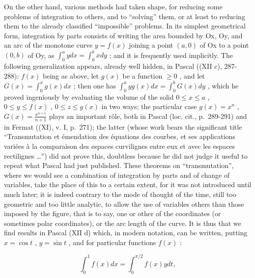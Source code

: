 On the other hand, various methods had taken shape, for reducing some problems of integration to others, and to ``solving'' them, or at least to reducing them to the already classified ``impossible'' problems. In its simplest geometrical form, integration by parts consists of writing the area bounded by Ox, Oy, and an arc of the monotone curve \(y = f(x)\) joining a point \((a, 0)\) of Ox to a point \((0, b)\) of Oy, as \(\int_{0}^{a} y dx = \int_{0}^{b} x dy\) ; and it is frequently used implicitly. The following generalization appears, already well hidden, in Pascal ((XII c), 287-288): \(f(x)\) being as above, let \(g(x)\) be a function \(\geqslant 0\) , and let \(G(x) = \int_{0}^{x} g(x) dx\) ; then one has \(\int_{0}^{a} y g(x) dx = \int_{0}^{b} G(x) dy\) , which he proved ingeniously by evaluating the volume of the solid \(0 \leqslant x \leqslant a\) , \(0 \leqslant y \leqslant f(x)\) , \(0 \leqslant z \leqslant g(x)\) in two ways; the particular case \(g(x) = x^{n}\) , \(G(x) = \frac{x^{n+1}}{n+1}\) plays an important rôle, both in Pascal (loc. cit., p.~289-291) and in Fermat ((XI), v. I, p.~271); the latter (whose work bears the significant title ``Transmutation et émendation des équations des courbes, et ses applications variées à la comparaison des espaces curvilignes entre eux et avec les espaces rectilignes \ldots'') did not prove this, doubtless because he did not judge it useful to repeat what Pascal had just published. These theorems on ``transmutation'', where we would see a combination of integration by parts and of change of variables, take the place of this to a certain extent, for it was not introduced until much later; it is indeed contrary to the mode of thought of the time, still too geometric and too little analytic, to allow the use of variables others than those imposed by the figure, that is to say, one or other of the coordinates (or sometimes polar coordinates), or the arc length of the curve. It is thus that we find results in Pascal (XII d) which, in modern notation, can be written, putting \(x = \cos t\) , \(y = \sin t\) , and for particular functions \(f(x)\) :

\[
\int_ {0} ^ {1} f (x) d x = \int_ {0} ^ {\pi / 2} f (x) y d t,
\]

